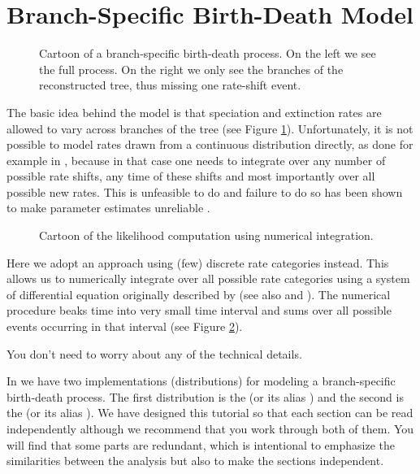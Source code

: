 

\bigskip
\section{Branch-Specific Birth-Death Model}

\begin{figure}[htbp!]
\centering
{}
\caption{\small Cartoon of a branch-specific birth-death process. On the left we see the full process. On the right we only see the branches of the reconstructed tree, thus missing one rate-shift event.}
\label{fig:BSBD}
\end{figure}
The basic idea behind the model is that speciation and extinction rates are allowed to vary across branches of the tree (see Figure \ref{fig:BSBD}).
Unfortunately, it is not possible to model rates drawn from a continuous distribution directly, as done for example in \BAMM, because in that case one needs to integrate over any number of possible rate shifts, any time of these shifts and most importantly over all possible new rates.
This is unfeasible to do and failure to do so has been shown to make parameter estimates unreliable \citep{Moore2016}.

\begin{figure}[htbp!]
\centering
{}
\caption{\small Cartoon of the likelihood computation using numerical integration.}
\label{fig:BSBD_likelihood}
\end{figure}
Here we adopt an approach using (few) discrete rate categories instead.
This allows us to numerically integrate over all possible rate categories using a system of differential equation originally described by \cite{Maddison2007} (see also \cite{FitzJohn2009} and \cite{FitzJohn2010}).
The numerical procedure beaks time into very small time interval and sums over all possible events occurring in that interval (see Figure \ref{fig:BSBD_likelihood}).

You don't need to worry about any of the technical details.

In \RevBayes we have two implementations (\IE distributions) for modeling a branch-specific birth-death process.
The first distribution is the  (or its alias ) and the second is the  (or its alias ).
We have designed this tutorial so that each section can be read independently although we recommend that you work through both of them.
You will find that some parts are redundant, which is intentional to emphasize the similarities between the analysis but also to make the sections independent.


